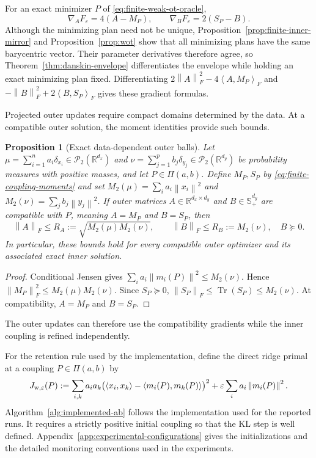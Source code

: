 \documentclass[11pt]{article}
\newcommand{\R}{\mathbb R}
\newcommand{\cP}{\mathcal P}
\newcommand{\ip}[2]{\left\langle #1,#2\right\rangle}
\newcommand{\norm}[1]{\left\lVert #1\right\rVert}
\DeclareMathOperator{\Tr}{Tr}
\theoremstyle{plain}
\newtheorem{proposition}[theorem]{Proposition}
\theoremstyle{definition}
\theoremstyle{remark}
\begin{document}
For an exact minimizer \(P\) of \eqref{eq:finite-weak-ot-oracle},
\[
  \nabla_A F_\varepsilon=4(A-M_P),
  \qquad \nabla_B F_\varepsilon=2(S_P-B).
\]
Although the minimizing plan need not be unique, Proposition~\ref{prop:finite-inner-mirror}
and Proposition~\ref{prop:wot} show that all minimizing plans have the same
barycentric vector. Their parameter derivatives therefore agree, so
Theorem~\ref{thm:danskin-envelope} differentiates the
envelope while holding an exact minimizing plan fixed. Differentiating
$2\norm A_F^2-4\ip A{M_P}_F$ and
$-\norm B_F^2+2\ip B{S_P}_F$ gives these gradient formulas.

Projected outer updates require compact domains determined by the data. At a
compatible outer solution, the moment identities provide such bounds.

\begin{proposition}[Exact data-dependent outer balls]\label{prop:balls}
Let \(\mu=\sum_{i=1}^n a_i\delta_{x_i}\in\cP_2(\R^{d_x})\) and
\(\nu=\sum_{j=1}^p b_j\delta_{y_j}\in\cP_2(\R^{d_y})\) be probability
measures with positive masses, and let \(P\in\Pi(a,b)\). Define \(M_P,S_P\) by
\eqref{eq:finite-coupling-moments} and set
\(M_2(\mu)=\sum_i a_i\norm{x_i}^2\) and
\(M_2(\nu)=\sum_j b_j\norm{y_j}^2\). If outer matrices
\(A\in\R^{d_x\times d_y}\) and \(B\in\mathbb S_+^{d_y}\) are compatible
with \(P\), meaning \(A=M_P\) and \(B=S_P\), then
\[
  \norm{A}_F\le R_A:=\sqrt{M_2(\mu)M_2(\nu)},
  \qquad \norm{B}_F\le R_B:=M_2(\nu),\quad B\succeq0.
\]
In particular, these bounds hold for every compatible outer optimizer and its
associated exact inner solution.
\end{proposition}

\begin{proof}
Conditional Jensen gives \(\sum_i a_i\norm{m_i(P)}^2\le M_2(\nu)\). Hence
\(\norm{M_P}_F^2\le M_2(\mu)M_2(\nu)\). Since \(S_P\succeq0\),
\(\norm{S_P}_F\le\Tr(S_P)\le M_2(\nu)\). At compatibility, \(A=M_P\) and
\(B=S_P\).
\end{proof}

The outer updates can therefore use the compatibility gradients while the inner
coupling is refined independently.

For the retention rule used by the implementation, define the direct ridge
primal at a coupling \(P\in\Pi(a,b)\) by
\begin{equation}\label{eq:finite-ridge-primal}
 J_{\rm w,\varepsilon}(P)
 :=\sum_{i,k}a_i a_k
 \bigl(\ip{x_i}{x_k}-\ip{m_i(P)}{m_k(P)}\bigr)^2
 +\varepsilon\sum_i a_i\norm{m_i(P)}^2.
\end{equation}
Algorithm~\ref{alg:implemented-ab} follows the implementation used for the
reported runs. It requires a strictly positive initial coupling so that the KL
step is well defined. Appendix~\ref{app:experimental-configurations} gives the
initializations and the detailed monitoring conventions used in the experiments.
\end{document}
